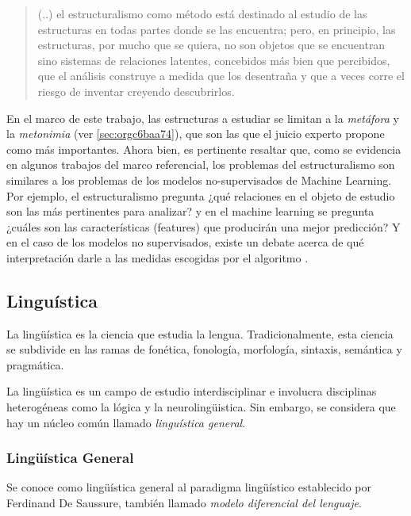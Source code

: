 \documentclass[12pt,letterpaper,twoside]{article}
\begin{document}
\begin{quote}
 (..) el estructuralismo como método está destinado al estudio de las
estructuras en todas partes donde se las encuentra; pero, en
principio, las estructuras, por mucho que se quiera, no son objetos
que se encuentran sino sistemas de relaciones latentes, concebidos más
bien que percibidos, que el análisis construye a medida que los
desentraña y que a veces corre el riesgo de inventar creyendo
descubrirlos.  \cite[pg. 145]{genette1996estructuralismo}
\end{quote}

En el marco de este trabajo, las estructuras a estudiar se limitan
a la \emph{metáfora} y la \emph{metonimia} (ver \ref{sec:orgc6baa74}), que son
las que el juicio experto propone como más importantes. Ahora
bien, es pertinente resaltar que, como se evidencia en algunos
trabajos del marco referencial, los problemas del estructuralismo
son similares a los problemas de los modelos no-supervisados de
Machine Learning. Por ejemplo, el estructuralismo pregunta ¿qué
relaciones en el objeto de estudio son las más pertinentes para
analizar? y en el machine learning se pregunta ¿cuáles son las
características (features) que producirán una mejor predicción? Y
en el caso de los modelos no supervisados, existe un debate acerca
de qué interpretación darle a las medidas escogidas por el
algoritmo \cite{van2019vector}.
\subsection{Linguística}
\label{sec:org5450fd8}

La lingüística es la ciencia que estudia la lengua.
Tradicionalmente, esta ciencia se subdivide en las ramas de
fonética, fonología, morfología, sintaxis, semántica y
pragmática. \cite{gelbukh2004}

La lingüística es un campo de estudio interdisciplinar e involucra
disciplinas heterogéneas como la lógica y la neurolingüistica. Sin
embargo, se considera que hay un núcleo común llamado \emph{linguística
general}.

\subsubsection{Lingüística General}
\label{sec:org12fdbf0}

Se conoce como lingüística general al paradigma lingüístico
establecido por Ferdinand De Saussure, también llamado \emph{modelo
diferencial del lenguaje}.
\end{document}
